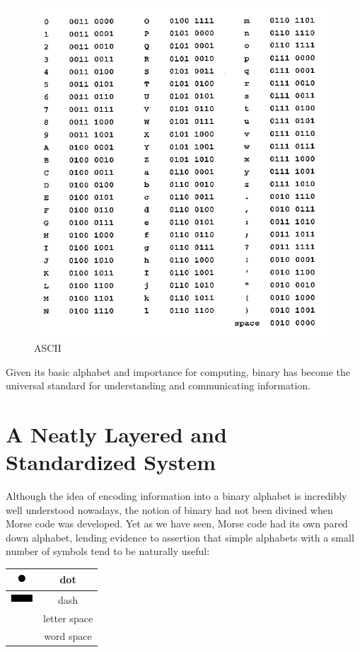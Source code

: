 \documentclass[UTF8]{book}
\newcommand*\thickdash{\includegraphics{thick-dash2}}
\newcommand*\thickdot{\includegraphics{thick-dot2}}
\begin{document}
\begin{CJK}{UTF8}{gbsn}
\begin{figure}[H]
\centering
\includegraphics[width=0.8\linewidth]{ascii-binary-chart}
\caption{ASCII}
\end{figure}

Given its basic alphabet and importance for computing, binary has become the universal standard for understanding and communicating information.

\section{A Neatly Layered and Standardized System}

Although the idea of encoding information into a binary alphabet is incredibly well understood nowadays, the notion of binary had not been divined when Morse code was developed. Yet as we have seen, Morse code had its own pared down alphabet, lending evidence to assertion that simple alphabets with a small number of symbols tend to be naturally useful:

\begin{center}
\begin{tabular}{cc}
\thickdot & dot \\
\hline
\thickdash & dash \\
\hline
[short pause] & letter space \\
\hline
[long pause] & word space \\
\end{tabular}
\end{center}


\end{CJK}
\end{document}

